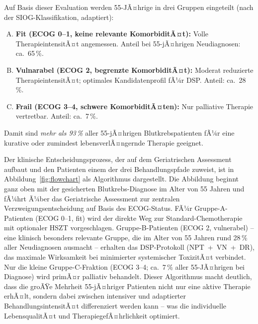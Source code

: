 ﻿\documentclass[12pt,a4paper]{article}
\theoremstyle{definition}
\begin{document}
Auf Basis dieser Evaluation werden 55-JÃ¤hrige in drei Gruppen eingeteilt (nach der
SIOG-Klassifikation, adaptiert):
\begin{enumerate}[A.]
  \item \textbf{Fit (ECOG 0--1, keine relevante KomorbiditÃ¤t):} Volle
        TherapieintensitÃ¤t angemessen. Anteil bei 55-jÃ¤hrigen Neudiagnosen: ca.\ 65\,\%.
  \item \textbf{Vulnarabel (ECOG 2, begrenzte KomorbiditÃ¤t):} Moderat reduzierte
        TherapieintensitÃ¤t; optimales Kandidatenprofil fÃ¼r DSP. Anteil: ca.\ 28\,\%.
  \item \textbf{Frail (ECOG 3--4, schwere KomorbiditÃ¤ten):} Nur palliative
        Therapie vertretbar. Anteil: ca.\ 7\,\%.
\end{enumerate}

Damit sind \emph{mehr als 93\,\%} aller 55-jÃ¤hrigen Blutkrebspatienten fÃ¼r eine
kurative oder zumindest lebensverlÃ¤ngernde Therapie geeignet.

Der klinische Entscheidungsprozess, der auf dem Geriatrischen Assessment aufbaut
und den Patienten einem der drei Behandlungspfade zuweist, ist in
Abbildung~\ref{fig:flowchart} als Algorithmus dargestellt. Die Abbildung beginnt
ganz oben mit der gesicherten Blutkrebs-Diagnose im Alter von 55 Jahren und fÃ¼hrt
Ã¼ber das Geriatrische Assessment zur zentralen Verzweigungsentscheidung auf Basis
des ECOG-Status. FÃ¼r Gruppe-A-Patienten (ECOG 0--1, fit) wird der direkte Weg
zur Standard-Chemotherapie mit optionaler HSZT vorgeschlagen. Gruppe-B-Patienten
(ECOG 2, vulnerabel) -- eine klinisch besonders relevante Gruppe, die im Alter
von 55 Jahren rund 28\,\% aller Neudiagnosen ausmacht -- erhalten das DSP-Protokoll
(NPT~+~VN~+~DR), das maximale Wirksamkeit bei minimierter systemischer ToxizitÃ¤t
verbindet. Nur die kleine Gruppe-C-Fraktion (ECOG 3--4; ca.~7\,\% aller 55-JÃ¤hrigen
bei Diagnose) wird primÃ¤r palliativ behandelt. Dieser Algorithmus macht deutlich,
dass die groÃŸe Mehrheit 55-jÃ¤hriger Patienten nicht nur eine aktive Therapie
erhÃ¤lt, sondern dabei zwischen intensiver und adaptierter BehandlungsintensitÃ¤t
differenziert werden kann -- was die individuelle LebensqualitÃ¤t und
TherapiegefÃ¤hrlichkeit optimiert.
\end{document}
